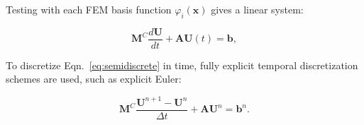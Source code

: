 Testing with each FEM basis function $\varphi_i(\mathbf{x})$ gives a linear system:

\begin{equation}\label{eq:semidiscrete}
      \mathbf{M}^C\frac{d\mathbf{U}}{dt}+\mathbf{A} \mathbf{U}(t) = \mathbf{b},
\end{equation}

To discretize Eqn.~\ref{eq:semidiscrete} in time, fully explicit
temporal discretization schemes are used, such as explicit Euler:

\begin{equation}\label{eq:exgalerkin}
   \mathbf{M}^C\frac{\mathbf{U}^{n+1}-\mathbf{U}^n}{\Delta t}
     + \mathbf{A}\mathbf{U}^n = \mathbf{b}^n.
\end{equation}
